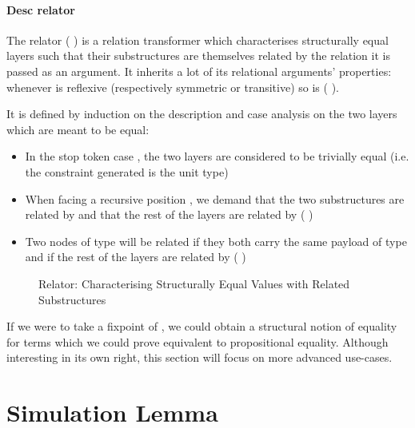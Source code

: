 \paragraph{Desc relator}
The relator (  ) is a relation transformer which characterises
structurally equal layers such that their substructures are themselves related
by the relation it is passed as an argument. It inherits a lot of its relational
arguments' properties: whenever  is reflexive (respectively symmetric or
transitive) so is {(   )}.\label{lem:zipstable}

It is defined by induction on the description and case analysis on the two
layers which are meant to be equal:
\begin{itemize}
  \item In the stop token case  , the two layers are considered to
    be trivially equal (i.e. the constraint generated is the unit type)
  \item When facing a recursive position { \AB{$\Delta$}  }, we
    demand that the two substructures are related by { \AB{$\Delta$} }
    and that the rest of the layers are related by (   )
  \item Two nodes of type {  } will
    be related if they both carry the same payload  of type  and if
    the rest of the layers are related by (    )
\end{itemize}

\begin{figure}[h]
\caption{Relator: Characterising Structurally Equal Values with Related Substructures\label{fig:zip-rel}}
\end{figure}

If we were to take a fixpoint of , we could obtain a structural
notion of equality for terms which we could prove equivalent to propositional
equality. Although interesting in its own right, this section will focus
on more advanced use-cases.


\section{Simulation Lemma}\label{section:simulation}

